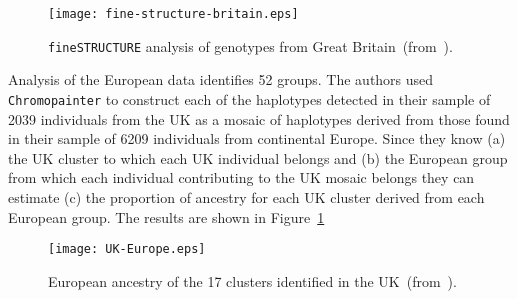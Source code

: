 \begin{figure}
\texttt{[image: fine-structure-britain.eps]}
\caption{{\tt fineSTRUCTURE} analysis of genotypes from Great Britain~(from~\cite{Leslie-etal-2015}).}
\end{figure}

Analysis of the European data identifies 52 groups. The authors used
{\tt Chromopainter} to construct each of the haplotypes detected in
their sample of 2039 individuals from the UK as a mosaic of haplotypes
derived from those found in their sample of 6209 individuals from
continental Europe. Since they know (a) the UK cluster to which each
UK individual belongs and (b) the European group from which each
individual contributing to the UK mosaic belongs they can estimate (c)
the proportion of ancestry for each UK cluster derived from each
European group. The results are shown in Figure~\ref{fig:old-UK-Europe}

\begin{figure}
\begin{center}
\texttt{[image: UK-Europe.eps]}
\end{center}
\caption{European ancestry of the 17 clusters identified in the UK~(from~\cite{Leslie-etal-2015}).}\label{fig:old-UK-Europe}
\end{figure}

\vfill

